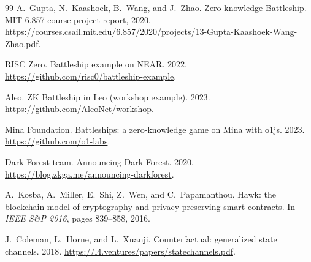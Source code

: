 \documentclass[11pt,a4paper]{article}
\begin{document}
\begin{thebibliography}{99}
 A.~Gupta, N.~Kaashoek, B.~Wang, and J.~Zhao.
Zero-knowledge Battleship. MIT 6.857 course project report, 2020.
\url{https://courses.csail.mit.edu/6.857/2020/projects/13-Gupta-Kaashoek-Wang-Zhao.pdf}.

 RISC Zero.
Battleship example on NEAR. 2022.
\url{https://github.com/risc0/battleship-example}.

 Aleo.
ZK Battleship in Leo (workshop example). 2023.
\url{https://github.com/AleoNet/workshop}.

 Mina Foundation.
Battleships: a zero-knowledge game on Mina with o1js. 2023.
\url{https://github.com/o1-labs}.

 Dark Forest team.
Announcing Dark Forest. 2020. \url{https://blog.zkga.me/announcing-darkforest}.

 A.~Kosba, A.~Miller, E.~Shi, Z.~Wen, and C.~Papamanthou.
Hawk: the blockchain model of cryptography and privacy-preserving smart
contracts. In \emph{IEEE S\&P 2016}, pages 839--858, 2016.

 J.~Coleman, L.~Horne, and L.~Xuanji.
Counterfactual: generalized state channels. 2018.
\url{https://l4.ventures/papers/statechannels.pdf}.

\end{thebibliography}
\end{document}
